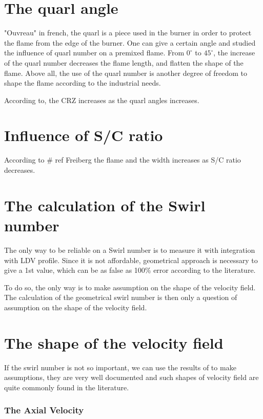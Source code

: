 \section{The quarl angle}

"Ouvreau" in french, the quarl is a piece used in the burner in order to protect the flame from the edge of the burner. One can give a certain angle and \cite{paul_jourdaine_nom_effect_2016} studied the influence of quarl number on a premixed flame. From $0^\circ $ to $45^\circ $, the increase of the quarl number decreases the flame length, and flatten the shape of the flame. Above all, the use of the quarl number is another degree of freedom to shape the flame according to the industrial needs.

According to\cite{milosavljevic_influence_1990}, the CRZ increases as the quarl angles increases.	

\section{Influence of S/C ratio}

According to \# ref Freiberg the flame and the width increases as S/C ratio decreases.

\section{The calculation of the Swirl number}

The only way to be reliable on a Swirl number is to measure it with integration with LDV profile. Since it is not affordable, geometrical approach is necessary to give a 1st value, which can be as false as 100\% error according to the literature.

To do so, the only way is to make assumption on the shape of the velocity field. The calculation of the geometrical swirl number is then only a question of assumption on the shape of the velocity field.

\section{The shape of the velocity field}

If the swirl number is not so important, we can use the results of \cite{durox_flame_2013} to make assumptions, they are very well documented and such shapes of velocity field are quite commonly found in the literature. 

\subsubsection{The Axial Velocity}

